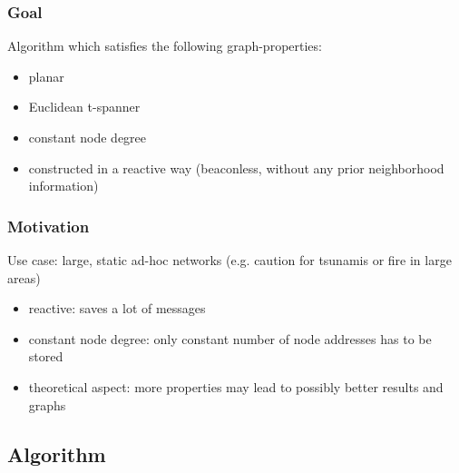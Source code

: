 \documentclass[compress]{beamer}
\begin{document}
\begin{frame}
\frametitle{Goal}
Algorithm which satisfies the following graph-properties:
\begin{itemize}
\item planar
\item Euclidean t-spanner
\item constant node degree
\item constructed in a reactive way (beaconless, without any prior neighborhood information)
\end{itemize}
\end{frame}

\begin{frame}
\frametitle{Motivation}
Use case: large, static ad-hoc networks (e.g. caution for tsunamis or fire in large areas)
\begin{itemize}
\item reactive: saves a lot of messages
\item constant node degree: only constant number of node addresses has to be stored
\item theoretical aspect: more properties may lead to possibly better results and graphs
\end{itemize}
\end{frame}

\subsection{Algorithm}
\end{document}
